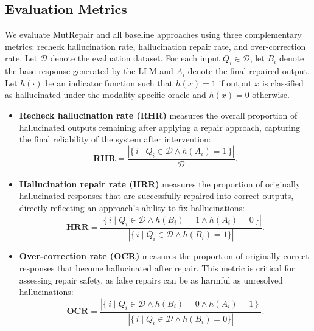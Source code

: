 \documentclass[acmsmall,screen,review,anonymous]{acmart}
\begin{document}
\subsection{Evaluation Metrics}

We evaluate MutRepair and all baseline approaches using three complementary metrics: recheck hallucination rate, hallucination repair rate, and over-correction rate. Let $\mathcal{D}$ denote the evaluation dataset. For each input $Q_i \in \mathcal{D}$, let $B_i$ denote the base response generated by the LLM and $A_i$ denote the final repaired output. Let $h(\cdot)$ be an indicator function such that $h(x)=1$ if output $x$ is classified as hallucinated under the modality-specific oracle and $h(x)=0$ otherwise.

\begin{itemize}[leftmargin=10pt]

\item \textbf{Recheck hallucination rate (RHR)} measures the overall proportion of hallucinated outputs remaining after applying a repair approach, capturing the final reliability of the system after intervention:
\begin{equation}
\textbf{RHR} =
\frac{\left|\{\, i \mid Q_i \in \mathcal{D} \land h(A_i)=1 \,\}\right|}
{\left| \mathcal{D} \right|}.
\end{equation}

\item \textbf{Hallucination repair rate (HRR)} measures the proportion of originally hallucinated responses that are successfully repaired into correct outputs, directly reflecting an approach's ability to fix hallucinations:
\begin{equation}
\textbf{HRR} =
\frac{\left|\{\, i \mid Q_i \in \mathcal{D} \land h(B_i)=1 \land h(A_i)=0 \,\}\right|}
{\left| \{\, i \mid Q_i \in \mathcal{D} \land h(B_i)=1\} \right|}.
\end{equation}

\item \textbf{Over-correction rate (OCR)} measures the proportion of originally correct responses that become hallucinated after repair. This metric is critical for assessing repair safety, as false repairs can be as harmful as unresolved hallucinations:
\begin{equation}
\textbf{OCR} =
\frac{\left|\{\, i \mid Q_i \in \mathcal{D} \land h(B_i)=0 \land h(A_i)=1 \,\}\right|}
{\left| \{\, i \mid Q_i \in \mathcal{D} \land h(B_i)=0\} \right|}.
\end{equation}

\end{itemize}
\end{document}
